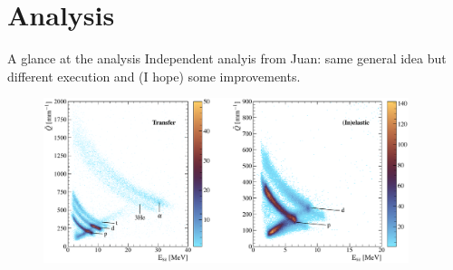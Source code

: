 \documentclass[aspectratio=43, dvipsnames]{beamer}
\begin{document}
\section{Analysis}
\begin{frame}{A glance at the analysis}
	Independent analyis from Juan: same general idea but different execution and (I hope) some improvements.
	\begin{figure}
		\includegraphics[width=0.95\textwidth]{figures/pid.pdf}
	\end{figure}
	\begin{columns}[c]
		\begin{column}{0.5\linewidth}
		\end{column}%
		\begin{column}{0.5\linewidth}
		\end{column}
	\end{columns}



\end{frame}
\end{document}
